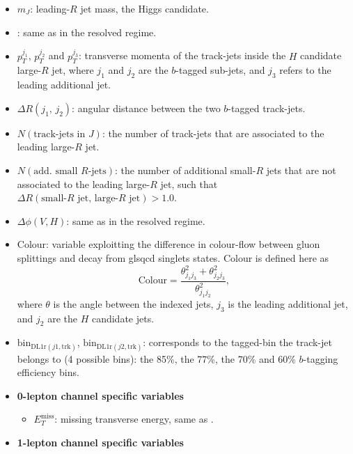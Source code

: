 
\begin{itemize}
  \item $m_J$: leading-$R$ jet mass, the Higgs candidate.
  \item \ptv: same as in the resolved regime.
  \item $p_{T}^{j_1}$, $p_{T}^{j_2}$ and $p_{T}^{j_3}$: transverse momenta of the track-jets inside the $H$ candidate large-$R$ jet, where $j_1$ and $j_2$ are the $b$-tagged sub-jets, and $j_3$ refers to the leading additional jet.
  \item $\Delta R(j_1,\,j_2)$: angular distance between the two $b$-tagged track-jets.  
  \item $N(\text{track-jets in $J$})$: the number of track-jets that are associated to the leading large-$R$ jet. 
  \item $N(\text{add. small $R$-jets})$: the number of additional small-$R$ jets that are not associated to the leading large-$R$ jet, such that $\Delta R (\text{small-$R$ jet, large-$R$ jet}) > 1.0$.  
  \item  $\Delta \phi(\textbf{$V$},\textbf{$H$})$: same as in the resolved regime.
  \item Colour: variable exploitting the difference in colour-flow between gluon splittings and decay from gls{qcd} singlets states. Colour is defined here as \[ \textrm{Colour} = \frac{\theta_{j_1j_3}^2 + \theta_{j_2j_3}^2}{\theta_{j_1j_2}^2},\] where $\theta$ is the angle between the indexed jets, $j_3$ is the leading additional jet, and $j_2$ are the $H$ candidate jets.
  \item $\mathrm{bin}_{\mathrm{DL1r}(j1,\text{trk})}$, $\mathrm{bin}_{\mathrm{DL1r}(j2,\text{trk})}$: corresponds to the tagged-bin the track-jet belongs to (4 possible bins): 
  the 85\%, the 77\%, the 70\% and 60\% $b$-tagging efficiency bins.
  \item \textbf{0-lepton channel specific variables}
  \begin{itemize}
      \item $E_T^{\textrm{miss}}$: missing transverse energy, same as \ptv.
  \end{itemize}
  \item \textbf{1-lepton channel specific variables}

\end{itemize}
